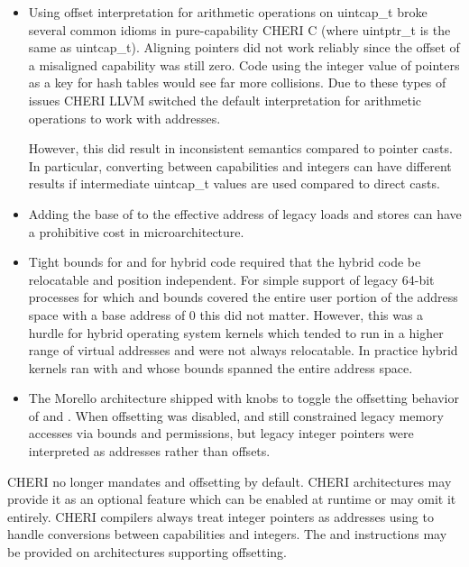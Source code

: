 \begin{itemize}
\item Using offset interpretation for arithmetic operations on
  uintcap\_t broke several common idioms in pure-capability CHERI C
  (where uintptr\_t is the same as uintcap\_t).  Aligning pointers did
  not work reliably since the offset of a misaligned capability was
  still zero.  Code using the integer value of pointers as a key for
  hash tables would see far more collisions.  Due to these types of
  issues CHERI LLVM switched the default interpretation for arithmetic
  operations to work with addresses.

  However, this did result in inconsistent semantics compared to
  pointer casts.  In particular, converting between capabilities and
  integers can have different results if intermediate uintcap\_t
  values are used compared to direct casts.

\item Adding the base of \DDC{} to the effective address of legacy
  loads and stores can have a prohibitive cost in microarchitecture.

\item Tight bounds for \DDC{} and \PCC{} for hybrid code required that
  the hybrid code be relocatable and position independent.  For simple
  support of legacy 64-bit processes for which \DDC{} and \PCC{}
  bounds covered the entire user portion of the address space with a
  base address of 0 this did not matter.  However, this was a hurdle
  for hybrid operating system kernels which tended to run in a higher
  range of virtual addresses and were not always relocatable.  In
  practice hybrid kernels ran with \DDC{} and \PCC{} whose bounds
  spanned the entire address space.

\item The Morello architecture shipped with knobs to toggle the
  offsetting behavior of \DDC{} and \PCC{}.  When offsetting was
  disabled, \DDC{} and \PCC{} still constrained legacy memory accesses
  via bounds and permissions, but legacy integer pointers were
  interpreted as addresses rather than offsets.
\end{itemize}

CHERI no longer mandates \DDC{} and \PCC{} offsetting by default.
CHERI architectures may provide it as an optional feature which can be
enabled at runtime or may omit it entirely.  CHERI compilers always
treat integer pointers as addresses using
 to handle conversions between capabilities and
integers.  The  and  instructions
may be provided on architectures supporting offsetting.

